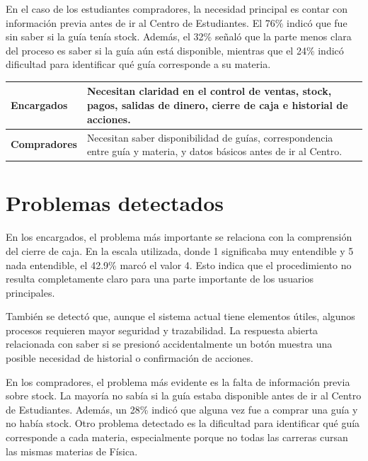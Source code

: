 \documentclass[12pt,letterpaper]{article}
\begin{document}
En el caso de los estudiantes compradores, la necesidad principal es contar con información previa antes de ir al Centro de Estudiantes. El 76\% indicó que fue sin saber si la guía tenía stock. Además, el 32\% señaló que la parte menos clara del proceso es saber si la guía aún está disponible, mientras que el 24\% indicó dificultad para identificar qué guía corresponde a su materia.

\begin{center}
\begin{tabularx}{\textwidth}{|>{\bfseries}p{5cm}|X|}
\hline
Encargados & Necesitan claridad en el control de ventas, stock, pagos, salidas de dinero, cierre de caja e historial de acciones. \\
\hline
Compradores & Necesitan saber disponibilidad de guías, correspondencia entre guía y materia, y datos básicos antes de ir al Centro. \\
\hline
\end{tabularx}
\end{center}

\section{Problemas detectados}

En los encargados, el problema más importante se relaciona con la comprensión del cierre de caja. En la escala utilizada, donde 1 significaba muy entendible y 5 nada entendible, el 42.9\% marcó el valor 4. Esto indica que el procedimiento no resulta completamente claro para una parte importante de los usuarios principales.

También se detectó que, aunque el sistema actual tiene elementos útiles, algunos procesos requieren mayor seguridad y trazabilidad. La respuesta abierta relacionada con saber si se presionó accidentalmente un botón muestra una posible necesidad de historial o confirmación de acciones.

En los compradores, el problema más evidente es la falta de información previa sobre stock. La mayoría no sabía si la guía estaba disponible antes de ir al Centro de Estudiantes. Además, un 28\% indicó que alguna vez fue a comprar una guía y no había stock. Otro problema detectado es la dificultad para identificar qué guía corresponde a cada materia, especialmente porque no todas las carreras cursan las mismas materias de Física.
\end{document}
